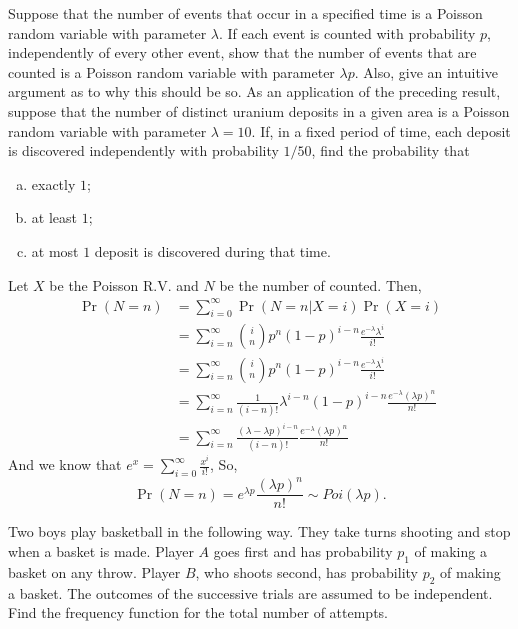 \documentclass[14pt]{elegantbook}
\begin{document}
    \begin{exercise*}[4]
        Suppose that the number of events that occur in a specified time is a Poisson random variable with parameter $\lambda$. If each event is counted with probability $p$, independently of every other event, show that the number of events that are counted is a Poisson random variable with parameter $\lambda p$. Also, give an intuitive argument as to why this should be so. As an application of the preceding result, suppose that the number of distinct uranium deposits in a given area is a Poisson random variable with parameter $\lambda = 10$. If, in a fixed period of time, each deposit is discovered independently with probability  $1/50$, find the probability that 
        \begin{enumerate}[(a)]
            \item exactly $1$; 
            \item at least $1$; 
            \item at most $1$ deposit is discovered during that time.  
        \end{enumerate}
    \end{exercise*}

    \begin{solution}
        Let $X$ be the Poisson R.V. and $N$ be the number of counted. Then, 
        \begin{align*}
            \Pr(N=n)&=\sum_{i=0}^\infty \Pr(N=n|X=i)\Pr(X=i)\\
            &=\sum_{i=n}^\infty \binom{i}{n}p^n(1-p)^{i-n}\frac{e^{-\lambda}\lambda^i}{i!}\\
            &=\sum_{i=n}^\infty \binom{i}{n}p^n(1-p)^{i-n}\frac{e^{-\lambda}\lambda^i}{i!}\\
            &=\sum_{i=n}^\infty \frac{1}{(i-n)!}\lambda^{i-n}(1-p)^{i-n}\frac{e^{-\lambda}(\lambda p)^{n}}{n!}\\
            &=\sum_{i=n}^\infty \frac{(\lambda-\lambda p)^{i-n}}{(i-n)!}\frac{e^{-\lambda}(\lambda p)^{n}}{n!}
        \end{align*}
        And we know that $e^x=\sum_{i=0}^\infty\frac{x^i}{i!}$, So, 
        \[
            \Pr(N=n)=e^{\lambda p}\frac{(\lambda p)^n}{n!}\sim Poi(\lambda p). 
        \]
    \end{solution}

    \begin{exercise*}[5]
        Two boys play basketball in the following way. They take turns shooting and stop when a basket is made. Player $A$ goes first and has probability $p_1$ of making a basket on any throw. Player $B$, who shoots second, has probability $p_2$ of making a basket. The outcomes of the successive trials are assumed to be independent. Find the frequency function for the total number of attempts. 
    \end{exercise*}
\end{document}
